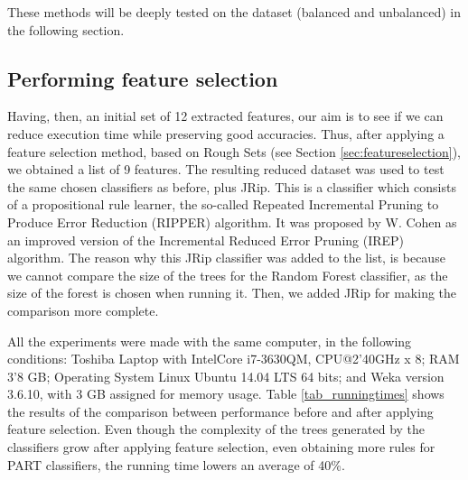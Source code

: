 \documentclass{llncs}
\begin{document}
These methods will be deeply tested on the dataset (balanced and unbalanced) in the following section.

%
\subsection{Performing feature selection}
\label{subsec:featselresults}

Having, then, an initial set of 12 extracted features, our aim is to see if we can reduce execution time while preserving good accuracies. Thus, after applying a feature selection method, based on Rough Sets (see Section \ref{sec:featureselection}), we obtained a list of 9 features. The resulting reduced dataset was used to test the same chosen classifiers as before, plus JRip. This is a classifier which consists of a propositional rule learner, the so-called Repeated Incremental Pruning to Produce Error Reduction (RIPPER) algorithm. It was proposed by W. Cohen \cite{cohen1995fast} as an improved version of the Incremental Reduced Error Pruning (IREP) algorithm. The reason why this JRip classifier was added to the list, is because we cannot compare the size of the trees for the Random Forest classifier, as the size of the forest is chosen when running it. Then, we added JRip for making the comparison more complete.

All the experiments were made with the same computer, in the following conditions: Toshiba Laptop with Intel\texttrademark  Core i7-3630QM, CPU@2'40GHz x 8; RAM 3'8 GB; Operating System Linux Ubuntu 14.04 LTS 64 bits; and Weka version 3.6.10, with 3 GB assigned for memory usage. Table \ref{tab_runningtimes} shows the results of the comparison between performance before and after applying feature selection. Even though the complexity of the trees generated by the classifiers grow after applying feature selection, even obtaining more rules for PART classifiers, the running time lowers an average of 40\%.
\end{document}

